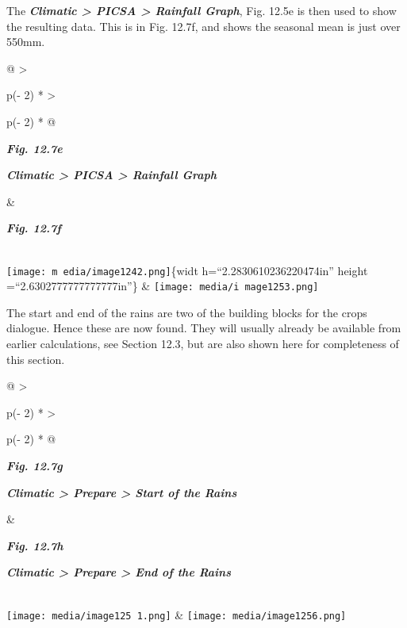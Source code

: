 \documentclass[
  letterpaper,
  DIV=11,
  numbers=noendperiod]{scrreprt}
\begin{document}
The \textbf{\emph{Climatic \textgreater{} PICSA \textgreater{} Rainfall
Graph}}, Fig. 12.5e is then used to show the resulting data. This is in
Fig. 12.7f, and shows the seasonal mean is just over 550mm.

\begin{longtable}[]{@{}
  >{\raggedright\arraybackslash}p{(\columnwidth - 2\tabcolsep) * }
  >{\raggedright\arraybackslash}p{(\columnwidth - 2\tabcolsep) * }@{}}
\toprule\noalign{}
\begin{minipage}[b]{\linewidth}\raggedright
\textbf{\emph{Fig. 12.7e}}

\textbf{\emph{Climatic \textgreater{} PICSA \textgreater{} Rainfall
Graph}}
\end{minipage} & \begin{minipage}[b]{\linewidth}\raggedright
\textbf{\emph{Fig. 12.7f}}
\end{minipage} \\
\midrule\noalign{}
\endhead
\bottomrule\noalign{}
\endlastfoot
\texttt{[image: m edia/image1242.png]}\{widt h=``2.2830610236220474in''
height =``2.6302777777777777in''\} &
\texttt{[image: media/i mage1253.png]} \\
\end{longtable}

The start and end of the rains are two of the building blocks for the
crops dialogue. Hence these are now found. They will usually already be
available from earlier calculations, see Section 12.3, but are also
shown here for completeness of this section.

\begin{longtable}[]{@{}
  >{\raggedright\arraybackslash}p{(\columnwidth - 2\tabcolsep) * }
  >{\raggedright\arraybackslash}p{(\columnwidth - 2\tabcolsep) * }@{}}
\toprule\noalign{}
\begin{minipage}[b]{\linewidth}\raggedright
\textbf{\emph{Fig. 12.7g}}

\textbf{\emph{Climatic \textgreater{} Prepare \textgreater{} Start of
the Rains}}
\end{minipage} & \begin{minipage}[b]{\linewidth}\raggedright
\textbf{\emph{Fig. 12.7h}}

\textbf{\emph{Climatic \textgreater{} Prepare \textgreater{} End of the
Rains}}
\end{minipage} \\
\midrule\noalign{}
\endhead
\bottomrule\noalign{}
\endlastfoot
\texttt{[image: media/image125 1.png]}
&
\texttt{[image: media/image1256.png]} \\
\end{longtable}
\end{document}
